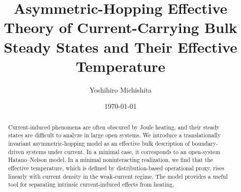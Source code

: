 \documentclass[a4paper, amsfonts, amssymb, amsmath, reprint, showkeys, nofootinbib, twoside,superscriptaddress, prb]{revtex4-2}
\begin{document}
\title{Asymmetric-Hopping Effective Theory of Current-Carrying Bulk Steady States and Their Effective Temperature}
\author{Yoshihiro Michishita}
    \date{\today} 
\begin{abstract}
    Current-induced phenomena are often obscured by Joule heating, and their steady states are difficult to analyze in large open systems. We introduce a translationally invariant asymmetric-hopping model as an effective bulk description of boundary-driven systems under current. In a minimal case, it corresponds to an open-system Hatano--Nelson model. In a minimal noninteracting realization, we find that the effective temperature, which is defined by distribution-based operational proxy, rises linearly with current density in the weak-current regime. The model provides a useful tool for separating intrinsic current-induced effects from heating.
\end{abstract}
\keywords{}
\maketitle
\end{document}
